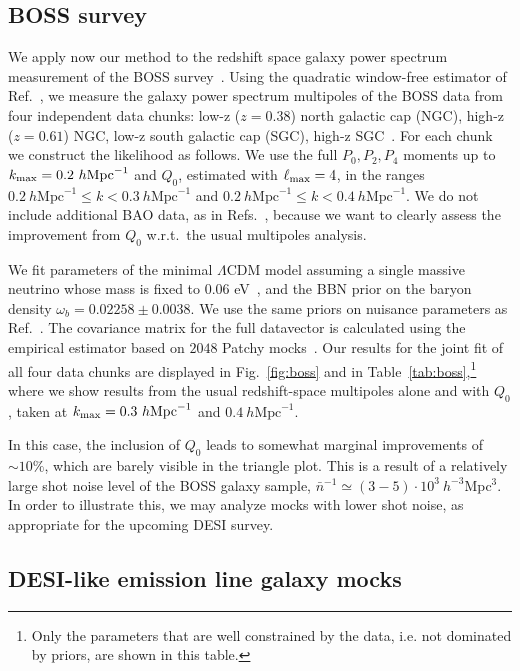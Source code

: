 \documentclass[12pt,a4paper]{article}
\newcommand\hMpc{h\text{Mpc}^{-1}}
\newcommand{\kmax}{k_{\rm max}}
\newcommand{\lmax}{\ell_{\rm max}}
\begin{document}
\subsection{BOSS survey}

We apply now our method to the redshift space galaxy power spectrum
measurement of the BOSS survey~\cite{Alam:2016hwk}. 
Using the quadratic window-free estimator of Ref.~\cite{Philcox:2020vbm},
we measure the galaxy power 
spectrum multipoles of the BOSS data from four independent data chunks: 
low-z ($z=0.38$) north galactic cap (NGC), high-z ($z=0.61$) NGC, low-z south galactic cap (SGC), high-z SGC~\cite{Alam:2016hwk,Ivanov:2019pdj}. 
For each chunk we construct the likelihood as follows.
We use the full $P_0,P_2,P_4$ moments up to $\kmax=0.2~\hMpc$
and $Q_0$, estimated  with $\lmax=4$, in the ranges $0.2~\hMpc \leq k< 0.3~\hMpc$
and $0.2~\hMpc \leq k< 0.4~\hMpc$.
We do not include 
additional BAO data, as in
Refs.~\cite{Philcox:2020vvt,Chudaykin:2020ghx,Ivanov:2021zmi},
because we want to clearly 
assess the improvement from $Q_0$
w.r.t.~the usual multipoles analysis.



We fit parameters of the minimal $\Lambda$CDM model assuming 
a single massive neutrino whose mass is fixed to $0.06$ eV~\cite{Aghanim:2018eyx}, and the BBN prior on the 
baryon density $\omega_b=0.02258\pm 0.0038$.
We use the same priors on nuisance parameters as Ref.~\cite{Chudaykin:2020ghx}.
The covariance matrix for the full datavector is calculated
using the empirical estimator based on $2048$ 
Patchy mocks~\cite{Kitaura:2015uqa}. Our results 
for the joint fit of all four data chunks are displayed 
in Fig.~\ref{fig:boss} and
in Table~\ref{tab:boss},\footnote{Only the parameters that are well constrained by the data, i.e. not dominated by priors, are shown in this table.} where we show results 
from the usual
redshift-space
multipoles 
alone and
with $Q_0$,
taken at $k_{\rm max}=0.3~\hMpc$
and $0.4~\hMpc$.

In this case, the inclusion of $Q_0$ leads to somewhat marginal improvements of $\sim 10\%$, which are barely visible in
the triangle plot.
This is a result of a relatively large shot noise level of the 
BOSS galaxy sample, $\bar n^{-1}\simeq (3-5)\cdot 10^3~h^{-3}$Mpc$^{3}$. In order to illustrate this, we may analyze mocks with lower shot noise, as appropriate for the upcoming DESI survey.




\subsection{DESI-like emission line galaxy mocks}
\end{document}
